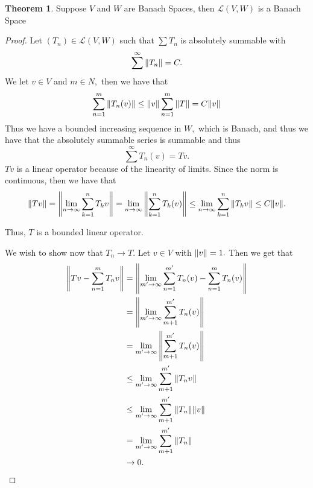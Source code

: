 \documentclass[10pt, oneside]{article}
\theoremstyle{definition}
\newtheorem{thm}{Theorem}
\begin{document}
\begin{thm}
    Suppose $V$ and $W$ are Banach Spaces, then $\mathcal{L}(V,W)$ is a Banach Space
\end{thm}
\begin{proof}
    Let $(T_n)\in \mathcal{L}(V,W)$ such that $\sum T_n$ is absolutely summable with 
    \[\sum^\infty \norm{T_n} = C.\] We let $v\in V$ and $m \in N,$ then we have that 
    \[\sum_{n=1}^m \norm{T_n(v)} \leq \norm{v}\sum_{n=1}^m \norm{T} = C\norm{v}\] Thus we have a bounded increasing sequence in $W,$ which is Banach, and thus we have that the absolutely summable series is summable and thus
    \[\sum^\infty T_n(v)  = Tv.\] $Tv$ is a linear operator because of the linearity of limits. Since the norm is continuous, then we have that 
    \[\norm{Tv} = \norm{\lim_{n\to \infty} \sum_{k=1}^n T_kv} = \lim_{n\to \infty}\norm{\sum_{k=1}^n T_k(v)}\leq \lim_{n\to \infty}\sum_{k=1}^n \norm{T_kv} \leq C\norm{v}.\] 
    
    Thus, $T$ is a bounded linear operator.

    We wish to show now that $T_n \to T.$ Let $v\in V$ with $\norm{v} = 1.$ Then we get that 
    \begin{align*}
        \norm{ Tv - \sum_{n=1}^m T_nv} &= \norm{\lim_{m'\to \infty} \sum_{n=1}^{m'}T_n(v) - \sum_{n=1}^m T_n(v)}\\
        &= \norm{\lim_{m'\to \infty} \sum_{m+1}^{m'}T_n(v)}\\
        &= \lim_{m' \to \infty}\norm{\sum_{m+1}^{m'}T_n(v)}\\
        &\leq \lim_{m'\to \infty} \sum_{m+1}^{m'}\norm{T_nv}\\
        &\leq \lim_{m'\to \infty} \sum_{m+1}^{m'}\norm{T_n}\norm{v}\\
        &= \lim_{m'\to \infty} \sum_{m+1}^{m'}\norm{T_n}\\
        &\to 0.
    \end{align*}
\end{proof}
\newpage
\end{document}
